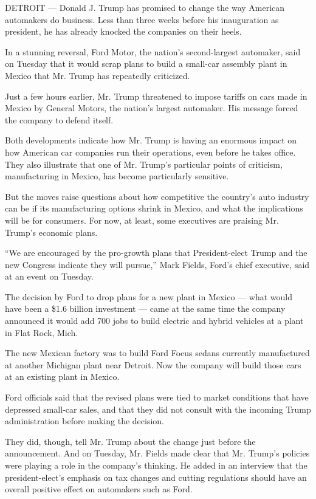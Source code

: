 DETROIT --- Donald J. Trump has promised to change the way American
automakers do business. Less than three weeks before his inauguration as
president, he has already knocked the companies on their heels.

In a stunning reversal, Ford Motor, the nation's second-largest
automaker, said on Tuesday that it would scrap plans to build a
small-car assembly plant in Mexico that Mr. Trump has repeatedly
criticized.

Just a few hours earlier, Mr. Trump threatened to impose tariffs on cars
made in Mexico by General Motors, the nation's largest automaker. His
message forced the company to defend itself.

Both developments indicate how Mr. Trump is having an enormous impact on
how American car companies run their operations, even before he takes
office. They also illustrate that one of Mr. Trump's particular points
of criticism, manufacturing in Mexico, has become particularly
sensitive.

But the moves raise questions about how competitive the country's auto
industry can be if its manufacturing options shrink in Mexico, and what
the implications will be for consumers. For now, at least, some
executives are praising Mr. Trump's economic plans.

``We are encouraged by the pro-growth plans that President-elect Trump
and the new Congress indicate they will pursue,'' Mark Fields, Ford's
chief executive, said at an event on Tuesday.

The decision by Ford to drop plans for a new plant in Mexico --- what
would have been a \$1.6 billion investment --- came at the same time the
company announced it would add 700 jobs to build electric and hybrid
vehicles at a plant in Flat Rock, Mich.

The new Mexican factory was to build Ford Focus sedans currently
manufactured at another Michigan plant near Detroit. Now the company
will build those cars at an existing plant in Mexico.

Ford officials said that the revised plans were tied to market
conditions that have depressed small-car sales, and that they did not
consult with the incoming Trump administration before making the
decision.

They did, though, tell Mr. Trump about the change just before the
announcement. And on Tuesday, Mr. Fields made clear that Mr. Trump's
policies were playing a role in the company's thinking. He added in an
interview that the president-elect's emphasis on tax changes and cutting
regulations should have an overall positive effect on automakers such as
Ford.

